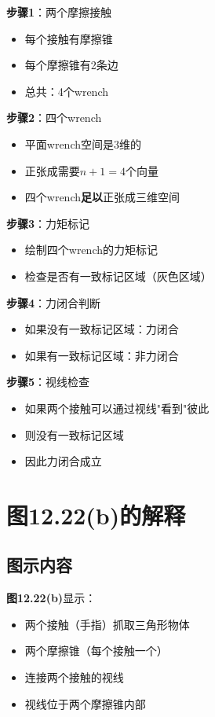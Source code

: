 \documentclass[12pt,a4paper]{article}
\begin{document}
\textbf{步骤1}：两个摩擦接触
\begin{itemize}
\item 每个接触有摩擦锥
\item 每个摩擦锥有2条边
\item 总共：4个wrench
\end{itemize}

\textbf{步骤2}：四个wrench
\begin{itemize}
\item 平面wrench空间是3维的
\item 正张成需要$n+1 = 4$个向量
\item 四个wrench\textbf{足以}正张成三维空间
\end{itemize}

\textbf{步骤3}：力矩标记
\begin{itemize}
\item 绘制四个wrench的力矩标记
\item 检查是否有一致标记区域（灰色区域）
\end{itemize}

\textbf{步骤4}：力闭合判断
\begin{itemize}
\item 如果没有一致标记区域：力闭合
\item 如果有一致标记区域：非力闭合
\end{itemize}

\textbf{步骤5}：视线检查
\begin{itemize}
\item 如果两个接触可以通过视线"看到"彼此
\item 则没有一致标记区域
\item 因此力闭合成立
\end{itemize}

\section{图12.22(b)的解释}

\subsection{图示内容}

\textbf{图12.22(b)}显示：
\begin{itemize}
\item 两个接触（手指）抓取三角形物体
\item 两个摩擦锥（每个接触一个）
\item 连接两个接触的视线
\item 视线位于两个摩擦锥内部
\end{itemize}
\end{document}
